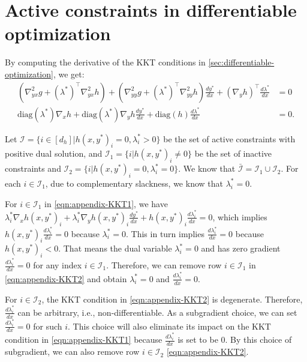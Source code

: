 \section{Active constraints in differentiable optimization}\label{sec:inactive-constraints-in-differentiable-optimization}
By computing the derivative of the KKT conditions in \cref{sec:differentiable-optimization}, we get:
\begin{align}
    (\nabla^2_{yx} g + (\lambda^*)^\top \nabla_{yx}^2 h) + (\nabla^2_{yy} g + (\lambda^*)^\top \nabla_{yy}^2 h) \frac{dy^*}{dx} + (\nabla_y h)^\top \frac{d\lambda^*}{dx} &= 0 \label{eqn:appendix-KKT1} \\
    \text{diag}(\lambda^*) \nabla_x h + \text{diag}(\lambda^*) \nabla_y h \frac{dy^*}{dx} + \text{diag}(h) \frac{d\lambda^*}{dx} &= 0. \label{eqn:appendix-KKT2}
\end{align}

Let $\mathcal{I} = \{ i \in [d_h] | h(x,y^*)_i = 0, \lambda^*_i > 0 \}$ be the set of active constraints with positive dual solution, and $\mathcal{I}_1 = \{ i | h(x,y^*)_i \neq 0 \}$ be the set of inactive constraints and $\mathcal{I}_2 = \{ i | h(x,y^*)_i = 0, \lambda^*_i = 0 \}$. We know that $\bar{\mathcal{I}} = \mathcal{I}_1 \cup \mathcal{I}_2$. For each $i \in \mathcal{I}_1$, due to complementary slackness, we know that $\lambda^*_i = 0$. 

For $i \in \mathcal{I}_1$ in \cref{eqn:appendix-KKT1}, we have $\lambda^*_i \nabla_x h(x,y^*)_i + \lambda^*_i \nabla_y h(x,y^*)_i \frac{dy^*}{dx} + h(x,y^*)_i \frac{d \lambda^*_i}{dx} = 0$, which implies $h(x,y^*)_i \frac{d \lambda^*_i}{dx} = 0$ because  $\lambda^*_i = 0$. This in turn implies $\frac{d \lambda^*_i}{dx} = 0 $ because $h(x,y^*)_i < 0$.
That means the dual variable $\lambda^*_i = 0$ and has zero gradient $\frac{d \lambda^*_i}{dx} = 0$ for any index $i \in \mathcal{I}_1$.
Therefore, we can remove row $i \in \mathcal{I}_1$ in \cref{eqn:appendix-KKT2} and obtain $\lambda^*_i = 0$ and $\frac{d \lambda^*_i}{dx} = 0$.

For $i \in \mathcal{I}_2$, the KKT condition in \cref{eqn:appendix-KKT2} is  degenerate. Therefore, $\frac{d \lambda^*_i}{d x}$ can be arbitrary, i.e., non-differentiable.
As a subgradient choice, we can set $\frac{d \lambda^*_i}{d x} = 0$ for such $i$. 
This choice will also eliminate its impact on the KKT condition in \cref{eqn:appendix-KKT1} because $\frac{d \lambda^*_i}{d x}$ is set to be $0$.
By this choice of subgradient, we can also remove row $i \in \mathcal{I}_2$ \cref{eqn:appendix-KKT2}.

